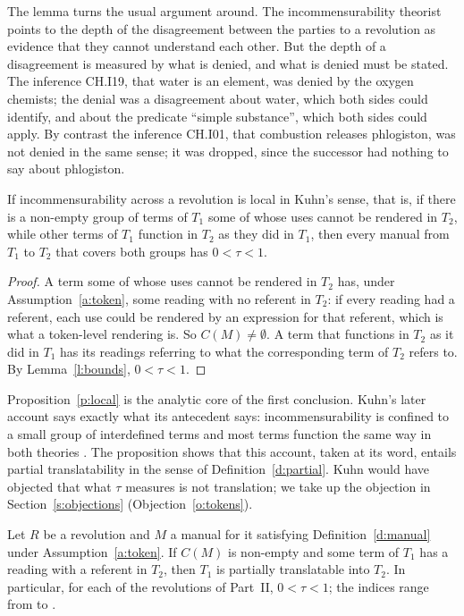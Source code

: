 \documentclass{situationist-preprint}
\begin{document}
The lemma turns the usual argument around. The incommensurability theorist points to the depth of the disagreement between the parties to a revolution as evidence that they cannot understand each other. But the depth of a disagreement is measured by what is denied, and what is denied must be stated. The inference CH.I19, that water is an element, was denied by the oxygen chemists; the denial was a disagreement about water, which both sides could identify, and about the predicate \enquote{simple substance}, which both sides could apply. By contrast the inference CH.I01, that combustion releases phlogiston, was not denied in the same sense; it was dropped, since the successor had nothing to say about phlogiston.

\begin{proposition}\label{p:local}
If incommensurability across a revolution is local in Kuhn's sense, that is, if there is a non-empty group of terms of $T_1$ some of whose uses cannot be rendered in $T_2$, while other terms of $T_1$ function in $T_2$ as they did in $T_1$, then every manual from $T_1$ to $T_2$ that covers both groups has $0 < \tau < 1$.
\end{proposition}

\begin{proof}
A term some of whose uses cannot be rendered in $T_2$ has, under Assumption~\ref{a:token}, some reading with no referent in $T_2$: if every reading had a referent, each use could be rendered by an expression for that referent, which is what a token-level rendering is. So $C(M) \neq \emptyset$. A term that functions in $T_2$ as it did in $T_1$ has its readings referring to what the corresponding term of $T_2$ refers to. By Lemma~\ref{l:bounds}, $0<\tau<1$.
\end{proof}

Proposition~\ref{p:local} is the analytic core of the first conclusion. Kuhn's later account says exactly what its antecedent says: incommensurability is confined to a small group of interdefined terms and most terms function the same way in both theories \citep{Kuhn1983}. The proposition shows that this account, taken at its word, entails partial translatability in the sense of Definition~\ref{d:partial}. Kuhn would have objected that what $\tau$ measures is not translation; we take up the objection in Section~\ref{s:objections} (Objection~\ref{o:tokens}).

\begin{theorem}\label{t:partial}
Let $R$ be a revolution and $M$ a manual for it satisfying Definition~\ref{d:manual} under Assumption~\ref{a:token}. If $C(M)$ is non-empty and some term of $T_1$ has a reading with a referent in $T_2$, then $T_1$ is partially translatable into $T_2$. In particular, for each of the \nrevs{} revolutions of Part~II, $0 < \tau < 1$; the indices range from \timin{} to \timax{}.
\end{theorem}
\end{document}
